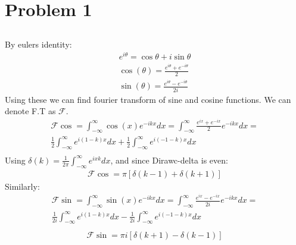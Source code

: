 \documentclass[12pt]{article}
\begin{document}
\renewcommand{\familydefault}{\rmdefault}



\section{Problem 1}
\subsection{}
By eulers identity:
\begin{equation}
    \begin{split}        
    e^{i\theta} = \cos\theta + i\sin\theta\\
    \cos(\theta) = \frac{e^{i\theta} + e^{-i\theta}}{2}\\
    \sin(\theta) = \frac{e^{i\theta} - e^{-i\theta}}{2i}
    \end{split}
\end{equation}
Using these we can find fourier transform of sine and cosine functions. We can denote F.T as $\mathcal{F}$.
\begin{equation}
    \begin{gathered}
        \mathcal{F}\cos = \int_{-\infty}^{\infty}\cos(x)e^{-ikx}dx = \int_{-\infty}^{\infty}\frac{e^{ix} + e^{-ix}}{2}e^{-ikx}dx = \\ 
        \frac{1}{2}\int_{-\infty}^{\infty}e^{i(1-k)x}dx + \frac{1}{2}\int_{-\infty}^{\infty}e^{i(-1-k)x}dx\\
    \end{gathered}
\end{equation}
Using $\delta(k)=\frac{1}{2\pi}\int_{-\infty}^{\infty}e^{ixk}dx$, and since Dirawc-delta is even:
\begin{equation}
    \begin{gathered}
        \mathcal{F}\cos = \pi\left[\delta(k-1)+\delta(k+1)\right]
    \end{gathered}
\end{equation}
Similarly:
\begin{equation}
    \begin{gathered}
        \mathcal{F}\sin = \int_{-\infty}^{\infty}\sin(x)e^{-ikx}dx = \int_{-\infty}^{\infty}\frac{e^{ix} - e^{-ix}}{2i}e^{-ikx}dx = \\ 
        \frac{1}{2i}\int_{-\infty}^{\infty}e^{i(1-k)x}dx - \frac{1}{2i}\int_{-\infty}^{\infty}e^{i(-1-k)x}dx\\
    \end{gathered}
\end{equation}
\begin{equation}
    \begin{gathered}
        \mathcal{F}\sin = \pi i\left[\delta(k+1)-\delta(k-1)\right]
    \end{gathered}
\end{equation}
\end{document}

